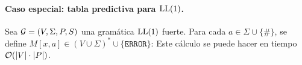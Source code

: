    \paragraph{Caso especial: tabla predictiva para $\text{LL}(1)$.} Sea $\mathcal{G}=(V,\Sigma, P, S)$ una gramática $\text{LL}(1)$ fuerte. Para cada $a \in \Sigma \cup \{\#\}$, se define $M[x,a] \in (V \cup \Sigma)^* \cup \{\texttt{ERROR}\}$:
    Este cálculo se puede hacer en tiempo $\mathcal{O}(|V|\cdot|P|)$.

